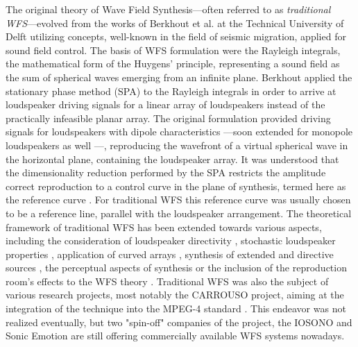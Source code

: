 The original theory of Wave Field Synthesis---often referred to as \emph{traditional WFS}---evolved from the works of Berkhout et al. at the Technical University of Delft utilizing concepts, well-known in the field of seismic migration, applied for sound field control.
The basis of WFS formulation were the Rayleigh integrals, the mathematical form of the Huygens' principle, representing a sound field as the sum of spherical waves emerging from an infinite plane.
Berkhout applied the stationary phase method (SPA) to the Rayleigh integrals in order to arrive at loudspeaker driving signals for a linear array of loudspeakers instead of the practically infeasible planar array.
The original formulation provided driving signals for loudspeakers with dipole characteristics \cite{Berkhout1988, Berkhout1993:Acoustic_control_by_WFS}---soon extended for monopole loudspeakers as well \cite{doi:10.1121/1.404755, Vogel1993:phd, devries1994the, Start1997:phd, Verheijen1997:phd, deBrujin2004}---, reproducing the wavefront of a virtual spherical wave in the horizontal plane, containing the loudspeaker array.
It was understood that the dimensionality reduction performed by the SPA restricts the amplitude correct reproduction to a control curve in the plane of synthesis, termed here as the reference curve \cite{sonke1998variable}.
For traditional WFS this reference curve was usually chosen to be a reference line, parallel with the loudspeaker arrangement.
The theoretical framework of traditional WFS has been extended towards various aspects, including the consideration of loudspeaker directivity \cite{devries1996sound, Firtha2012:isma}, stochastic loudspeaker properties \cite{Firtha2013:daga, Firtha2013:internoise}, application of curved arrays \cite{start1996application}, synthesis of extended and directive sources \cite{Corteel2007, Baalman2008:phd}, the perceptual aspects of synthesis \cite{Wittek2007:phd, Corteel2006:phd, Hulsebos2004:phd, wittek2004spatial, strauss2004generation} or the inclusion of the reproduction room's effects to the WFS theory \cite{spors2003an, corteel2003listening, 1326755, buchner2004efficient, petrausch2005simulation}.
Traditional WFS was also the subject of various research projects, most notably the CARROUSO project, aiming at the integration of the technique into the MPEG-4 standard \cite{sporer2001carrouso}. 
This endeavor was not realized eventually, but two "spin-off" companies of the project, the IOSONO and Sonic Emotion are still offering commercially available WFS systems nowadays.

